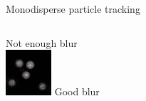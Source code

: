 \begin{frame}{Monodisperse particle tracking}
	\begin{columns}[T]
	\centering
	Not enough blur\\
	\includegraphics[width=\textwidth]{dillute_notblured}
	\centering
	Good blur\\
\end{columns}
\end{frame}

